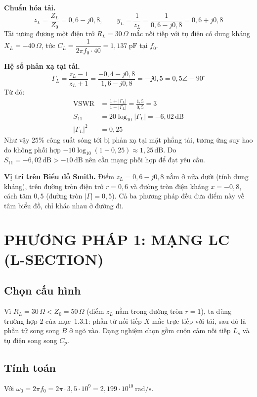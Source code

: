 \documentclass[a4paper]{report}
\newcommand\Zo{Z_0}
\newcommand\ZL{Z_L}
\newcommand\GL{\Gamma_L}
\newcommand\dB{\,\mathrm{dB}}
\begin{document}
\textbf{Chuẩn hóa tải.}
\begin{equation}
  z_L=\frac{\ZL}{\Zo}=0{,}6-j0{,}8,\qquad y_L=\frac{1}{z_L}=\frac{1}{0{,}6-j0{,}8}=0{,}6+j0{,}8
\end{equation}
Tải tương đương một điện trở $R_L=30\,\Omega$ mắc nối tiếp với tụ điện có dung kháng $X_L=-40\,\Omega$, tức $C_L=\dfrac{1}{2\pi f_0\cdot40}=1{,}137\ \mathrm{pF}$ tại $f_0$.

\textbf{Hệ số phản xạ tại tải.}
\begin{equation}
  \GL=\frac{z_L-1}{z_L+1}=\frac{-0{,}4-j0{,}8}{1{,}6-j0{,}8}=-j0{,}5=0{,}5\angle-90^\circ
\end{equation}
Từ đó:
\begin{align}
  \mathrm{VSWR}&=\frac{1+|\GL|}{1-|\GL|}=\frac{1{,}5}{0{,}5}=3\\
  S_{11}&=20\log_{10}|\GL|=-6{,}02\dB\\
  |\GL|^2&=0{,}25
\end{align}
Như vậy $25\%$ công suất sóng tới bị phản xạ tại mặt phẳng tải, tương ứng suy hao do không phối hợp $-10\log_{10}(1-0{,}25)\approx1{,}25\dB$. Do $S_{11}=-6{,}02\dB>-10\dB$ nên cần mạng phối hợp để đạt yêu cầu.

\textbf{Vị trí trên Biểu đồ Smith.} Điểm $z_L=0{,}6-j0{,}8$ nằm ở nửa dưới (tính dung kháng), trên đường tròn điện trở $r=0{,}6$ và đường tròn điện kháng $x=-0{,}8$, cách tâm $0{,}5$ (đường tròn $|\Gamma|=0{,}5$). Cả ba phương pháp đều đưa điểm này về tâm biểu đồ, chỉ khác nhau ở đường đi.

\section{PHƯƠNG PHÁP 1: MẠNG LC (L-SECTION)}

\subsection{Chọn cấu hình}
Vì $R_L=30\,\Omega<\Zo=50\,\Omega$ (điểm $z_L$ nằm trong đường tròn $r=1$), ta dùng trường hợp 2 của mục~1.3.1: phần tử nối tiếp $X$ mắc trực tiếp với tải, sau đó là phần tử song song $B$ ở ngõ vào. Dạng nghiệm chọn gồm cuộn cảm nối tiếp $L_s$ và tụ điện song song $C_p$.

\subsection{Tính toán}
Với $\omega_0=2\pi f_0=2\pi\cdot3{,}5\cdot10^{9}=2{,}199\cdot10^{10}\ \mathrm{rad/s}$.
\end{document}
